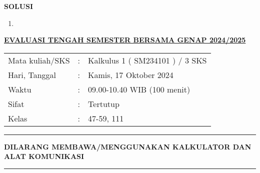 \documentclass[11pt,openany,a4paper]{article}
\renewcommand{\headrulewidth}{0pt}
\renewcommand{\footrulewidth}{0pt}
\begin{document}


\newpage
{}
{\centering\textbf{SOLUSI}}
\renewcommand{\arraystretch}{1.5}
\renewcommand{\headrulewidth}{1pt}
\begin{enumerate}
    \item
\end{enumerate}

\newpage
\renewcommand{\arraystretch}{1}
\fancyhead{}
\fancyfoot{}
\fancyhead[r]{}
\renewcommand{\headrulewidth}{0pt}
\renewcommand{\footrulewidth}{0pt}
\begin{center}
    {\underline{\textbf{\MakeUppercase{Evaluasi Tengah Semester Bersama Genap 2024/2025}}}}
\end{center}

\begin{center}
    \begin{tabular}{lcl}
        Mata kuliah/SKS & : & Kalkulus 1 ( SM234101 ) / 3 SKS \\
        Hari, Tanggal   & : & Kamis, 17 Oktober 2024          \\
        Waktu           & : & 09.00-10.40 WIB (100 menit)     \\
        Sifat           & : & Tertutup                        \\
        Kelas           & : & 47-59, 111
    \end{tabular}
\end{center}

\noindent\rule{\textwidth}{2.pt}

\setlength{\parindent}{5pt}
\setlength{\parindent}{5pt}
\setlength{\parindent}{5pt}
\par \textbf{\small\MakeUppercase{dilarang membawa/menggunakan kalkulator dan alat komunikasi}}
\par {}
\noindent\rule{\textwidth}{2.pt}
\end{document}

